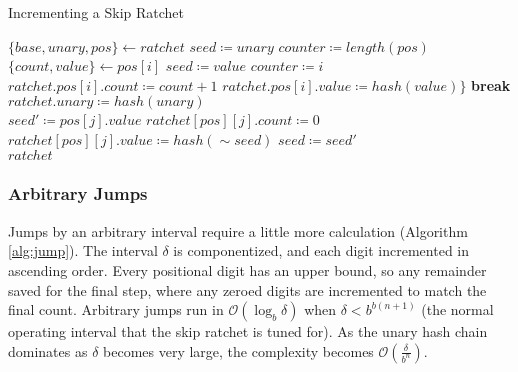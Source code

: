 \documentclass[twocolumn]{article}
\begin{document}
	\begin{algorithm*}
		\caption{Incrementing a Skip Ratchet}
		\label{alg:inc}

		\begin{algorithmic}[1]
				\State $\{base, unary, pos\} \gets ratchet$
				\State $seed \coloneqq unary$
				\State $counter \coloneqq length(pos)$
				\\
					\State $\{count, value\} \gets pos[i]$
					 
						\State $seed \coloneqq value$
						\State $counter \coloneqq i$
						\State $ratchet.pos[i].count \coloneqq count + 1$ \State $ratchet.pos[i].value \coloneqq hash(value)\}$
						\State \textbf{break}
					\EndIf
				\EndFor
				\\
				 
					\State $ratchet.unary \coloneqq hash(unary)$
				\EndIf
				\\
					 
						\State $seed' \coloneqq pos[j].value$
						\State $ratchet[pos][j].count \coloneqq 0$
						\State $ratchet[pos][j].value \coloneqq hash(\sim{seed})$
						\State $seed \coloneqq seed'$
					\EndFor
				\EndIf
				\\
				\State $ratchet$
				\EndFunction
		\end{algorithmic}
	\end{algorithm*}

	\subsubsection{Arbitrary Jumps}

	Jumps by an arbitrary interval require a little more calculation (Algorithm \ref{alg:jump}). The interval $\delta$ is componentized, and each digit incremented in ascending order. Every positional digit has an upper bound, so any remainder saved for the final step, where any zeroed digits are incremented to match the final count. Arbitrary jumps run in $\mathcal{O}(\log_{b} \delta)$ when $\delta < b^{b(n+1)}$ (the normal operating interval that the skip ratchet is tuned for). As the unary hash chain dominates as $\delta$ becomes very large, the complexity becomes $\mathcal{O}(\frac{\delta}{b^{n}})$.
\end{document}
